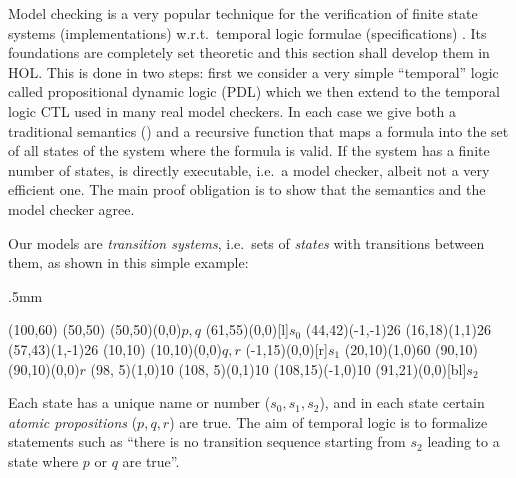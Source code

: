 %
\begin{isabellebody}%
\def\isabellecontext{Base}%
%
%
\begin{isamarkuptext}%
Model checking is a very popular technique for the verification of finite
state systems (implementations) w.r.t.\ temporal logic formulae
(specifications) \cite{Clark}. Its foundations are completely set theoretic
and this section shall develop them in HOL. This is done in two steps: first
we consider a very simple ``temporal'' logic called propositional dynamic
logic (PDL) which we then extend to the temporal logic CTL used in many real
model checkers. In each case we give both a traditional semantics (\isa{{\isasymTurnstile}}) and a
recursive function  that maps a formula into the set of all states of
the system where the formula is valid. If the system has a finite number of
states,  is directly executable, i.e.\ a model checker, albeit not a
very efficient one. The main proof obligation is to show that the semantics
and the model checker agree.

\underscoreon

Our models are \emph{transition systems}, i.e.\ sets of \emph{states} with
transitions between them, as shown in this simple example:
\begin{center}
\unitlength.5mm
\thicklines
\begin{picture}(100,60)
\put(50,50){}
\put(50,50){\makebox(0,0){$p,q$}}
\put(61,55){\makebox(0,0)[l]{$s_0$}}
\put(44,42){\vector(-1,-1){26}}
\put(16,18){\vector(1,1){26}}
\put(57,43){\vector(1,-1){26}}
\put(10,10){}
\put(10,10){\makebox(0,0){$q,r$}}
\put(-1,15){\makebox(0,0)[r]{$s_1$}}
\put(20,10){\vector(1,0){60}}
\put(90,10){}
\put(90,10){\makebox(0,0){$r$}}
\put(98, 5){\line(1,0){10}}
\put(108, 5){\line(0,1){10}}
\put(108,15){\vector(-1,0){10}}
\put(91,21){\makebox(0,0)[bl]{$s_2$}}
\end{picture}
\end{center}
Each state has a unique name or number ($s_0,s_1,s_2$), and in each
state certain \emph{atomic propositions} ($p,q,r$) are true.
The aim of temporal logic is to formalize statements such as ``there is no
transition sequence starting from $s_2$ leading to a state where $p$ or $q$
are true''.


\end{isamarkuptext}
\end{isabellebody}
